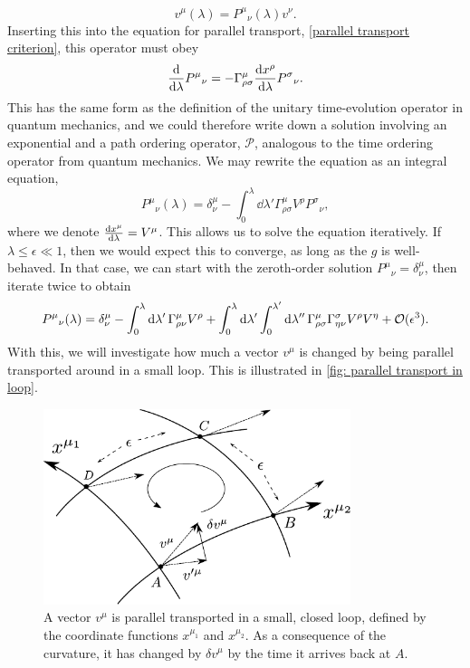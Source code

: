 %
\begin{equation}
    v^\mu(\lambda) = P^\mu{}_\nu(\lambda) v^\nu.
\end{equation}
%
Inserting this into the equation for parallel transport, \autoref{parallel transport criterion}, this operator must obey
%
\begin{equation}
    \odv{}{\lambda} P^\mu{}_\nu = - \Gamma^\mu_{\rho \sigma}  \odv{x^\rho}{\lambda}P^\sigma{}_\nu.
\end{equation}
%
This has the same form as the definition of the unitary time-evolution operator in quantum mechanics, and we could therefore write down a solution involving an exponential and a path ordering operator, $\mathcal P$, analogous to the time ordering operator from quantum mechanics.
We may rewrite the equation as an integral equation,
%
\begin{equation}
    P^\mu{}_\nu(\lambda) = \delta^\mu_\nu 
    - \int^\lambda_0 \dd \lambda' \Gamma^\mu_{\rho \sigma} V^\rho P^\sigma{}_\nu,
\end{equation}
%
where we denote $\odv{x^\mu}{\lambda} = V^\mu$.
This allows us to solve the equation iteratively.
If $\lambda \leq \epsilon \ll 1$, then we would expect this to converge, as long as the $g$ is well-behaved.
In that case, we can start with the zeroth-order solution $P^{\mu}{}_\nu = \delta^\mu_\nu$, then iterate twice to obtain
%
\begin{equation}
    \label{iterative paralell propagator}
    P^\mu{}_\nu(\lambda) 
    = 
    \delta^\mu_\nu 
    - \int_0^\lambda \text{d} \lambda' \, 
    \Gamma^\mu_{\rho \nu} V^\rho
    + \int_0^{\lambda} \text{d} \lambda ' \int_0^{\lambda'} \text{d} \lambda ''\,
    \Gamma^\mu_{\rho \sigma} \Gamma^\sigma_{\eta \nu} V^\rho V^\eta
    + \mathcal O(\epsilon^3).
\end{equation}
%
With this, we will investigate how much a vector $v^\mu$ is changed by being parallel transported around in a small loop.
This is illustrated in \autoref{fig: parallel transport in loop}.
%
\begin{figure}
    \centering
    \includegraphics[width=0.8\textwidth]{figurer/parallel_transport.pdf}
    \caption{A vector $v^\mu$ is parallel transported in a small, closed loop, defined by the coordinate functions $x^{\mu_1}$ and $x^{\mu_2}$.
    As a consequence of the curvature, it has changed by $\delta v^\mu$ by the time it arrives back at $A$.}
    \label{fig: parallel transport in loop}
\end{figure}
